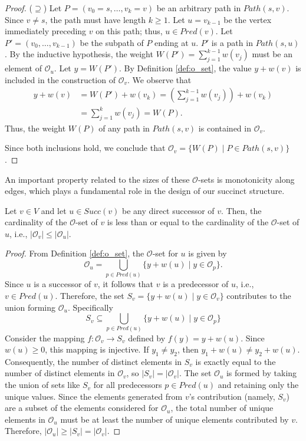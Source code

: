\begin{proof}
    ($\supseteq$) Let $P = (v_0=s, \dots, v_k=v)$ be an arbitrary path in $Path(s, v)$. Since $v \neq s$, the path must have length $k \ge 1$. Let $u = v_{k-1}$ be the vertex immediately preceding $v$ on this path; thus, $u \in Pred(v)$. Let $P' = (v_0, \dots, v_{k-1})$ be the subpath of $P$ ending at $u$. $P'$ is a path in $Path(s, u)$. By the inductive hypothesis, the weight $W(P') = \sum_{j=1}^{k-1} w(v_j)$ must be an element of $\mathcal{O}_u$. Let $y = W(P')$. By Definition \ref{def:o_set}, the value $y + w(v)$ is included in the construction of $\mathcal{O}_v$. We observe that
    \begin{align*}
        y + w(v) & = W(P') + w(v_k) = \left(\sum_{j=1}^{k-1} w(v_j)\right) + w(v_k) \\
                 & = \sum_{j=1}^{k} w(v_j) = W(P).
    \end{align*}
    Thus, the weight $W(P)$ of any path in $Path(s, v)$ is contained in $\mathcal{O}_v$.

    Since both inclusions hold, we conclude that $\mathcal{O}_v = \{ W(P) \mid P \in Path(s, v) \}$.
\end{proof}

An important property related to the sizes of these $\mathcal{O}$-sets is monotonicity along edges, which plays a fundamental role in the design of our succinct structure.

\begin{lemma}
    \label{lem:o_set_cardinality_monotonicity}
    Let $v \in V$ and let $u \in Succ(v)$ be any direct successor of $v$. Then, the cardinality of the $\mathcal{O}$-set of $v$ is less than or equal to the cardinality of the $\mathcal{O}$-set of $u$, i.e., $|\mathcal{O}_v| \le |\mathcal{O}_u|$.
\end{lemma}
\begin{proof}
    From Definition \ref{def:o_set}, the $\mathcal{O}$-set for $u$ is given by
    \[ \mathcal{O}_u = \bigcup_{p \in Pred(u)} \{ y + w(u) \mid y \in \mathcal{O}_p \}. \]
    Since $u$ is a successor of $v$, it follows that $v$ is a predecessor of $u$, i.e., $v \in Pred(u)$. Therefore, the set $S_v = \{ y + w(u) \mid y \in \mathcal{O}_v \}$ contributes to the union forming $\mathcal{O}_u$. Specifically
    \[S_v \subseteq \bigcup_{p \in Pred(u)} \{ y + w(u) \mid y \in \mathcal{O}_p \}\]
    Consider the mapping $f: \mathcal{O}_v \to S_v$ defined by $f(y) = y + w(u)$. Since $w(u) \ge 0$, this mapping is injective. If $y_1 \neq y_2$, then $y_1 + w(u) \neq y_2 + w(u)$. Consequently, the number of distinct elements in $S_v$ is exactly equal to the number of distinct elements in $\mathcal{O}_v$, so $|S_v| = |\mathcal{O}_v|$.
    The set $\mathcal{O}_u$ is formed by taking the union of sets like $S_v$ for all predecessors $p \in Pred(u)$ and retaining only the unique values. Since the elements generated from $v$'s contribution (namely, $S_v$) are a subset of the elements considered for $\mathcal{O}_u$, the total number of unique elements in $\mathcal{O}_u$ must be at least the number of unique elements contributed by $v$.
    Therefore, $|\mathcal{O}_u| \ge |S_v| = |\mathcal{O}_v|$.
\end{proof}

